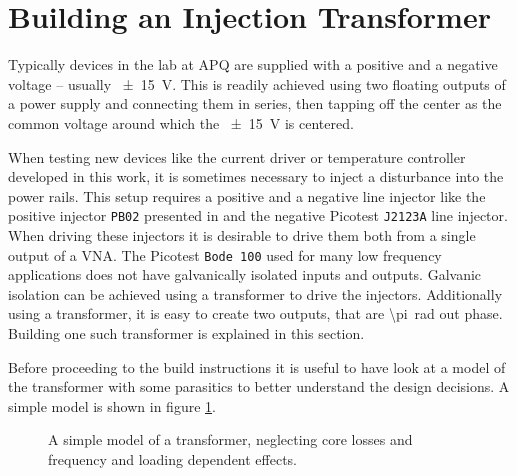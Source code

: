 \documentclass[12pt]{book}
\providecommand{\device}[1]{\texttt{\small #1}}
\begin{document}
\section{Building an Injection Transformer}
\label{sec:injection_transformer}
Typically devices in the lab at APQ are supplied with a positive and a negative voltage -- usually \qty{\pm 15}{\V}. This is readily achieved using two floating outputs of a power supply and connecting them in series, then tapping off the center as the common voltage around which the \qty{\pm 15}{\V} is centered.

When testing new devices like the current driver or temperature controller developed in this work, it is sometimes necessary to inject a disturbance into the power rails. This setup requires a positive and a negative line injector like the positive injector \device{PB02} presented in \cite{line_injector_github} and the negative Picotest \device{J2123A} line injector. When driving these injectors it is desirable to drive them both from a single output of a VNA. The Picotest \device{Bode 100} used for many low frequency applications does not have galvanically isolated inputs and outputs. Galvanic isolation can be achieved using a transformer to drive the injectors. Additionally using a transformer, it is easy to create two outputs, that are \qty{\pi}{\radian} out phase. Building one such transformer is explained in this section.

Before proceeding to the build instructions it is useful to have look at a model of the transformer with some parasitics to better understand the design decisions. A simple model is shown in figure \ref{fig:transformer_model}.

\begin{figure}[ht]
    \centering
    \caption{A simple model of a transformer, neglecting core losses and frequency and loading dependent effects.}
    \label{fig:transformer_model}
\end{figure}
\end{document}
